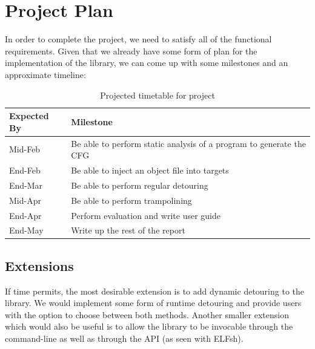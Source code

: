 \section{Project Plan}

In order to complete the project, we need to satisfy all of the functional requirements. Given that we already have some form of plan for the implementation of the library, we can come up with some milestones and an approximate timeline:

\begin{table}[H]
 \caption{Projected timetable for project}
 \begin{tabular}{l p{12cm} }
 \hline
 Expected By & Milestone \\
 \hline
 Mid-Feb & Be able to perform static analysis of a program to generate the CFG \\
 End-Feb & Be able to inject an object file into targets \\
 End-Mar & Be able to perform regular detouring \\
 Mid-Apr & Be able to perform trampolining \\
 End-Apr & Perform evaluation and write user guide\\
 End-May & Write up the rest of the report \\
 \hline
 \end{tabular}
\end{table}

\subsection{Extensions}

If time permits, the most desirable extension is to add dynamic detouring to the library. We would implement some form of runtime detouring and provide users with the option to choose between both methods. Another smaller extension which would also be useful is to allow the library to be invocable through the command-line as well as through the API (as seen with ELFsh).